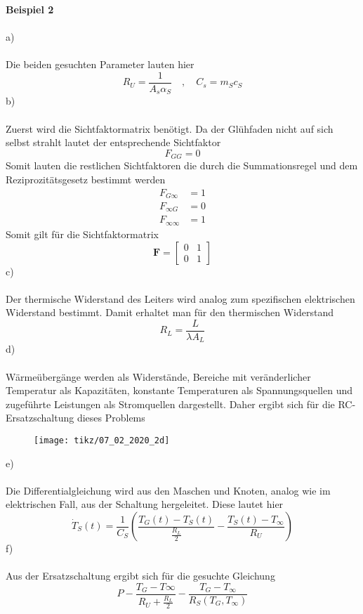 \textbf{Beispiel 2}\\ \\
a)\\ \\
Die beiden gesuchten Parameter lauten hier
\[
	R_U = \frac{1}{A_s\alpha_S} \quad,\quad C_s = m_Sc_S
\]
b) \\ \\
Zuerst wird die Sichtfaktormatrix benötigt. Da der Glühfaden nicht auf sich selbst strahlt lautet der entsprechende Sichtfaktor
\[
	F_{GG} = 0
\]
Somit lauten die restlichen Sichtfaktoren die durch die Summationsregel und dem Reziprozitätsgesetz bestimmt werden
\begin{align*}
	F_{G\infty} &= 1 \\
	F_{\infty G} &= 0 \\
	F_{\infty\infty} &= 1
\end{align*}
Somit gilt für die Sichtfaktormatrix
\[
	\textbf{F} = \begin{bmatrix}
		0 & 1 \\
		0 & 1
	\end{bmatrix}
\]
\newpage
\noindent
c) \\ \\
Der thermische Widerstand des Leiters wird analog zum spezifischen elektrischen Widerstand bestimmt. Damit erhaltet man für den thermischen Widerstand
\[
	R_L = \frac{L}{\lambda A_L}
\]
d) \\ \\
Wärmeübergänge werden als Widerstände, Bereiche mit veränderlicher Temperatur als Kapazitäten, konstante Temperaturen als Spannungsquellen und zugeführte Leistungen als Stromquellen dargestellt. Daher ergibt sich für die RC-Ersatzschaltung dieses Problems
\begin{figure}[h]
	\centering
	\texttt{[image: tikz/07\_02\_2020\_2d]}
\end{figure}
\newline
e) \\ \\
Die Differentialgleichung wird aus den Maschen und Knoten, analog wie im elektrischen Fall, aus der Schaltung hergeleitet. Diese lautet hier
\[
	\dot{T}_S(t) = \frac{1}{C_S}\left(\frac{T_G(t) - T_S(t)}{\frac{R_L}{2}} - \frac{T_S(t) - T_\infty}{R_U}\right)
\]
f)\\ \\
Aus der Ersatzschaltung ergibt sich für die gesuchte Gleichung
\[
	P - \frac{T_G - T\infty}{R_U + \frac{R_L}{2}} - \frac{T_G - T_\infty}{R_S(T_G,T_\infty)}
\]